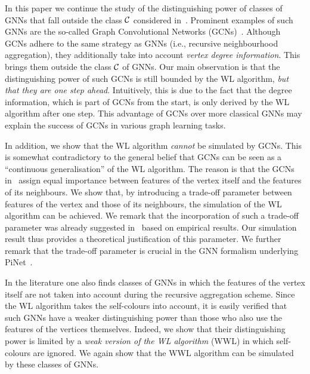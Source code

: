 In this paper we continue the study of the distinguishing power of classes of GNNs that fall outside the class ${\cal C}$ considered in~\cite{grohewl,xhlj19}.  Prominent examples of such GNNs are the so-called Graph Convolutional Networks (GCNs)~\cite{kipf-loose}. Although GCNs adhere to the same strategy as GNNs (i.e., recursive neighbourhood aggregation), they additionally take into account \textit{vertex degree information}. This brings them outside the class ${\cal C}$ of GNNs.  Our main observation is that the distinguishing power of such GCNs is still bounded by the WL algorithm, \textit{but that they are one step ahead}. Intuitively, this is due to the fact that the degree information, which is part of GCNs from the start, is only derived by the WL algorithm after one step. This advantage of GCNs over more classical GNNs may explain the success of GCNs in various graph learning tasks. 

In addition, we show that the WL algorithm \textit{cannot} be simulated by GCNs. This is somewhat contradictory to the general belief that GCNs can be seen as a ``continuous generalisation'' of the WL algorithm. The reason is that the GCNs in~\cite{kipf-loose} assign equal importance between features
of the vertex itself and the features of its neighbours. We show that, by introducing a trade-off parameter between features of the vertex and those of its neighbours, the simulation of the WL algorithm can be achieved. We remark that the incorporation of such a trade-off parameter was already suggested in~\cite{kipf-loose} based on empirical results.
Our simulation result thus provides a theoretical justification of this parameter. We further remark that the trade-off parameter is crucial in the GNN formalism underlying PiNet~\cite{DBLP:journals/corr/abs-1905-03046}.

In the literature one also finds classes of GNNs in which the features of the vertex itself are not taken into account during the recursive aggregation scheme. Since the WL algorithm takes the self-colours into account, it is easily verified that such GNNs have a weaker distinguishing power than those who also use the features of the vertices themselves. Indeed, we show that their distinguishing power is limited by a \textit{weak version of the WL algorithm} (WWL) in which self-colours are ignored. We again show that the WWL algorithm can be simulated by these classes of GNNs. 

